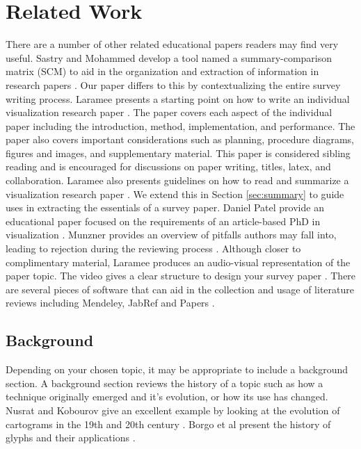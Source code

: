 \section{Related Work} \label{sec:related}
There are a number of other related educational papers readers may find very useful.
Sastry and Mohammed develop a tool named a summary-comparison matrix (SCM) to aid in the organization and extraction of information in research papers \cite{sastry2013summary}. Our paper differs to this by contextualizing the entire survey writing process.
Laramee presents a starting point on how to write an individual visualization research paper \cite{laramee2010write}. The paper covers each aspect of the individual paper including the introduction, method, implementation, and performance. The paper also covers important considerations such as planning, procedure diagrams, figures and images, and supplementary material. This paper is considered sibling reading and is encouraged for discussions on paper writing, titles, latex, and collaboration. Laramee also presents guidelines on how to read and summarize a visualization research paper \cite{laramee2011read}. We extend this in Section \ref{sec:summary} to guide uses in extracting the essentials of a survey paper. Daniel Patel provide an educational paper focused on the requirements of an article-based PhD in visualization \cite{patel2011phd}. Munzner provides an overview of pitfalls authors may fall into, leading to rejection during the reviewing process \cite{munzner2008process}. Although closer to complimentary material, Laramee produces an audio-visual representation of the paper topic. The video gives a clear structure to design your survey paper \cite{laramee2017how}. There are several pieces of software that can aid in the collection and usage of literature reviews including Mendeley, JabRef and Papers \cite{mendely2018mendely,jabref2019jabref,papers2019papers,refnwrite2018academic}.


\subsection{Background}
Depending on your chosen topic, it may be appropriate to include a background section. A background section reviews the history of a topic such as how a technique originally emerged and it's evolution, or how its use has changed.  Nusrat and Kobourov give an excellent example by looking at the evolution of cartograms in the 19th and 20th century \cite{nusrat2016state}. Borgo et al present the history of glyphs and their applications \cite{borgo2013glyph}.

